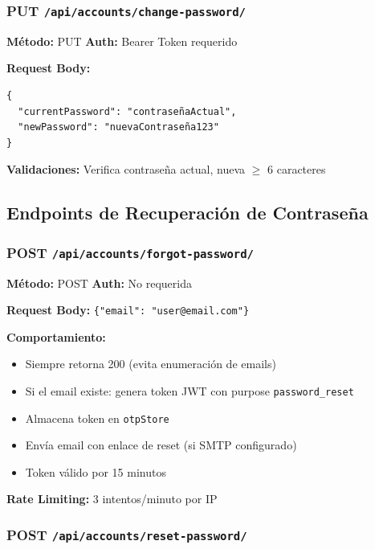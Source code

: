 \documentclass[12pt,a4paper,openany]{article}
\begin{document}
\subsubsection{PUT \texttt{/api/accounts/change-password/}}

\begin{infobox}
\textbf{Método:} PUT \quad \textbf{Auth:} Bearer Token requerido

\textbf{Request Body:}
\begin{lstlisting}[style=jsstyle]
{
  "currentPassword": "contraseñaActual",
  "newPassword": "nuevaContraseña123"
}
\end{lstlisting}

\textbf{Validaciones:} Verifica contraseña actual, nueva $\geq$ 6 caracteres
\end{infobox}

\subsection{Endpoints de Recuperación de Contraseña}

\subsubsection{POST \texttt{/api/accounts/forgot-password/}}

\begin{infobox}
\textbf{Método:} POST \quad \textbf{Auth:} No requerida

\textbf{Request Body:} \texttt{\{"email": "user@email.com"\}}

\textbf{Comportamiento:}
\begin{itemize}
    \item Siempre retorna 200 (evita enumeración de emails)
    \item Si el email existe: genera token JWT con purpose \texttt{password\_reset}
    \item Almacena token en \texttt{otpStore}
    \item Envía email con enlace de reset (si SMTP configurado)
    \item Token válido por 15 minutos
\end{itemize}

\textbf{Rate Limiting:} 3 intentos/minuto por IP
\end{infobox}

\subsubsection{POST \texttt{/api/accounts/reset-password/}}
\end{document}
